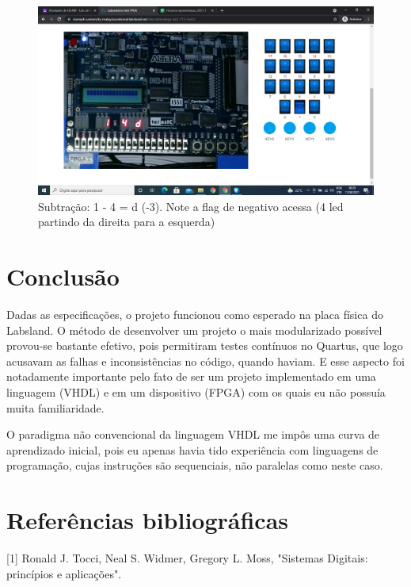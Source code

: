 \documentclass{article}
\begin{document}
\begin{center}
\begin{figure}
\includegraphics[width=\textwidth]{img/labsland_subtracao.png}
\caption{Subtração: 1 - 4 = d (-3). Note a flag de negativo acessa (4 led
    partindo da direita para a esquerda)}
\end{figure}

\end{center}

\section{Conclusão}

    Dadas as especificações, o projeto funcionou como esperado na placa física do
Labsland. O método de desenvolver um projeto o mais modularizado possível provou-se
bastante efetivo, pois permitiram testes contínuos no Quartus, que logo acusavam
as falhas e inconsistências no código, quando haviam. E esse aspecto foi notadamente
importante pelo fato de ser um projeto implementado em uma linguagem (VHDL) e em um 
dispositivo (FPGA) com os quais eu não possuía muita familiaridade.

O paradigma não convencional da linguagem VHDL me impôs uma curva de
aprendizado inicial, pois eu apenas havia tido experiência com linguagens de
programação, cujas instruções são sequenciais, não paralelas como neste caso.

\section{Referências bibliográficas}

[1] Ronald J. Tocci, Neal S. Widmer, Gregory L. Moss, "Sistemas Digitais: princípios e aplicações".
\end{document}
